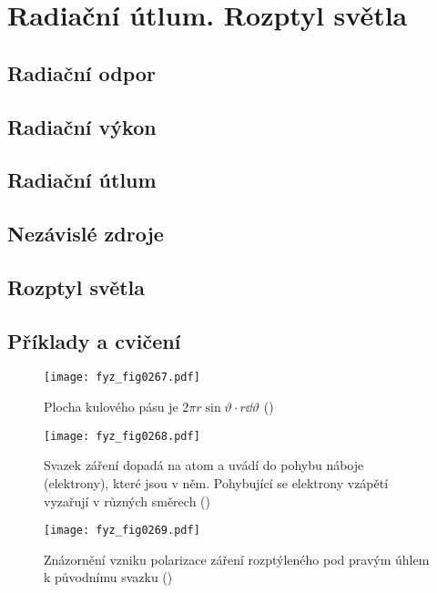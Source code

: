 \setchaptertoc
\chapter{Radiační útlum. Rozptyl světla}\label{fyz:IchapXXXII}

  \section{Radiační odpor}\label{fyz:IchapXXXIIsecI}
  \section{Radiační výkon}\label{fyz:IchapXXXIIsecII}
  \section{Radiační útlum}\label{fyz:IchapXXXIIsecIII}
  \section{Nezávislé zdroje}\label{fyz:IchapXXXIIsecIV}
  \section{Rozptyl světla}\label{fyz:IchapXXXIIsecV}
  \section{Příklady a cvičení}\label{fyz:IchapXXXIIsecVI}

    \begin{figure}[ht!] %
      \centering
      \texttt{[image: fyz\_fig0267.pdf]}
      \caption{Plocha kulového pásu je \(2\pi r\sin\vartheta\cdot r\dd{\vartheta}\) 
               (\cite[s.~427]{Feynman01})}
      \label{fyz:fig0267}
    \end{figure}

    \begin{figure}[ht!] %
      \centering
      \texttt{[image: fyz\_fig0268.pdf]}
      \caption{Svazek záření dopadá na atom a uvádí do pohybu náboje (elektrony), které jsou v něm. 
               Pohybující se elektrony vzápětí vyzařují v různých směrech
               (\cite[s.~432]{Feynman01})}
      \label{fyz:fig0268}
    \end{figure}

    \begin{figure}[ht!] %
      \centering
      \texttt{[image: fyz\_fig0269.pdf]}
      \caption{Znázornění vzniku polarizace záření rozptýleného pod pravým úhlem k původnímu svazku
               (\cite[s.~435]{Feynman01})}
      \label{fyz:fig0269}
    \end{figure}
    

